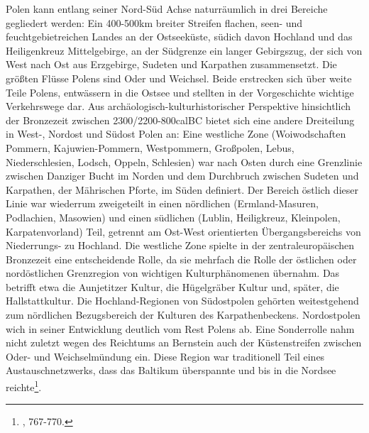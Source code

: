 \documentclass[openany,twoside,twocolumn]{book}
\let\rmarkdownfootnote\footnote%
\def\footnote{\protect\rmarkdownfootnote}
\begin{document}
Polen kann entlang seiner Nord-Süd Achse naturräumlich in drei Bereiche
gegliedert werden: Ein 400-500km breiter Streifen flachen, seen- und
feuchtgebietreichen Landes an der Ostseeküste, südich davon Hochland und
das Heiligenkreuz Mittelgebirge, an der Südgrenze ein langer Gebirgszug,
der sich von West nach Ost aus Erzgebirge, Sudeten und Karpathen
zusammensetzt. Die größten Flüsse Polens sind Oder und Weichsel. Beide
erstrecken sich über weite Teile Polens, entwässern in die Ostsee und
stellten in der Vorgeschichte wichtige Verkehrswege dar. Aus
archäologisch-kulturhistorischer Perspektive hinsichtlich der Bronzezeit
zwischen 2300/2200-800calBC bietet sich eine andere Dreiteilung in
West-, Nordost und Südost Polen an: Eine westliche Zone (Woiwodschaften
Pommern, Kajuwien-Pommern, Westpommern, Großpolen, Lebus,
Niederschlesien, Lodsch, Oppeln, Schlesien) war nach Osten durch eine
Grenzlinie zwischen Danziger Bucht im Norden und dem Durchbruch zwischen
Sudeten und Karpathen, der Mährischen Pforte, im Süden definiert. Der
Bereich östlich dieser Linie war wiederrum zweigeteilt in einen
nördlichen (Ermland-Masuren, Podlachien, Masowien) und einen südlichen
(Lublin, Heiligkreuz, Kleinpolen, Karpatenvorland) Teil, getrennt am
Ost-West orientierten Übergangsbereichs von Niederrungs- zu Hochland.
Die westliche Zone spielte in der zentraleuropäischen Bronzezeit eine
entscheidende Rolle, da sie mehrfach die Rolle der östlichen oder
nordöstlichen Grenzregion von wichtigen Kulturphänomenen übernahm. Das
betrifft etwa die Aunjetitzer Kultur, die Hügelgräber Kultur und,
später, die Hallstattkultur. Die Hochland-Regionen von Südostpolen
gehörten weitestgehend zum nördlichen Bezugsbereich der Kulturen des
Karpathenbeckens. Nordostpolen wich in seiner Entwicklung deutlich vom
Rest Polens ab. Eine Sonderrolle nahm nicht zuletzt wegen des Reichtums
an Bernstein auch der Küstenstreifen zwischen Oder- und Weichselmündung
ein. Diese Region war traditionell Teil eines Austauschnetzwerks, dass
das Baltikum überspannte und bis in die Nordsee reichte\footnote{\textcite{czebreszuk_bronze_2013},
  767-770.}.
\end{document}
